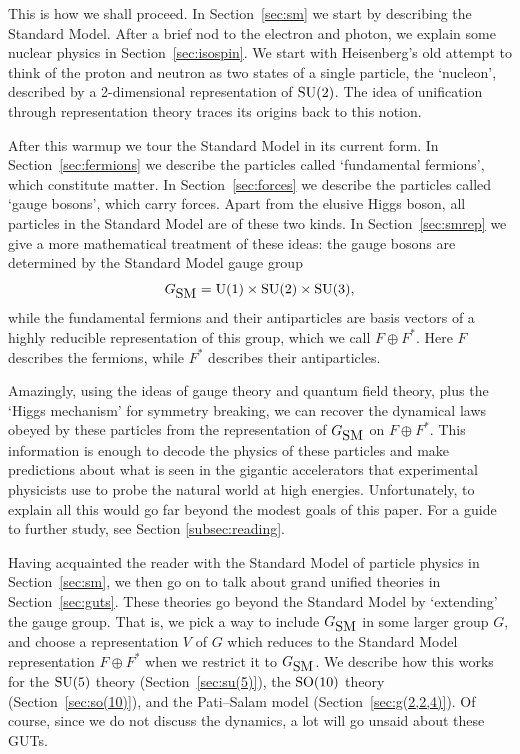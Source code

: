 \documentclass{article}
\newcommand{\U}{{\rm U}}    %
\newcommand{\SO}{{\rm SO}}    %
\newcommand{\SU}{{\rm SU}}    %
\newcommand{\GSM}{{G_{\mbox{\rm SM}}}}  %
\begin{document}
This is how we shall proceed. In Section~\ref{sec:sm} we start by
describing the Standard Model.  After a brief nod to the electron and
photon, we explain some nuclear physics in Section~\ref{sec:isospin}.
We start with Heisenberg's old attempt to think of the proton
and neutron as two states of a single particle, the `nucleon', 
described by a 2-dimensional representation of  $\SU(2)$.  The 
idea of unification through representation theory traces its origins 
back to this notion.

After this warmup we tour the Standard Model in its current form.
In Section~\ref{sec:fermions} we describe the particles called
`fundamental fermions', which constitute matter.  In
Section~\ref{sec:forces} we describe the particles called `gauge
bosons', which carry forces.  Apart from the elusive Higgs boson, all
particles in the Standard Model are of these two kinds.   In 
Section~\ref{sec:smrep} we give a more mathematical treatment of
these ideas: the gauge bosons are determined by the Standard Model
gauge group 
\[      \GSM = \U(1) \times \SU(2) \times \SU(3) , \]
while the fundamental fermions and their antiparticles are basis
vectors of a highly reducible representation of this group,
which we call $F \oplus F^*$.  Here $F$ describes the fermions, while
$F^*$ describes their antiparticles.
  
Amazingly, using the ideas of gauge theory and quantum field theory, plus 
the `Higgs mechanism' for symmetry breaking, we can recover the dynamical
laws obeyed by these particles from the representation of $\GSM$ on $F
\oplus F^*$.  This information is enough to decode the physics of these
particles and make predictions about what is seen in the gigantic
accelerators that experimental physicists use to probe the natural
world at high energies.  Unfortunately, to explain all this would 
go far beyond the modest goals of this paper.  For a guide
to further study, see Section \ref{subsec:reading}.

Having acquainted the reader with the Standard Model of particle
physics in Section~\ref{sec:sm}, we then go on to talk about grand
unified theories in Section~\ref{sec:guts}. These theories go beyond
the Standard Model by `extending' the gauge group. That is, we pick a
way to include $\GSM$ in some larger group $G$, and choose a 
representation $V$ of $G$ which reduces to the Standard Model
representation $F \oplus F^*$ when we restrict it to $\GSM$.  We
describe how this works for the $\SU(5)$ theory
(Section~\ref{sec:su(5)}), the $\SO(10)$ theory
(Section~\ref{sec:so(10)}), and the Pati--Salam model
(Section~\ref{sec:g(2,2,4)}).
Of course, since we do not discuss the dynamics, a lot will go
unsaid about these GUTs. 
\end{document}

